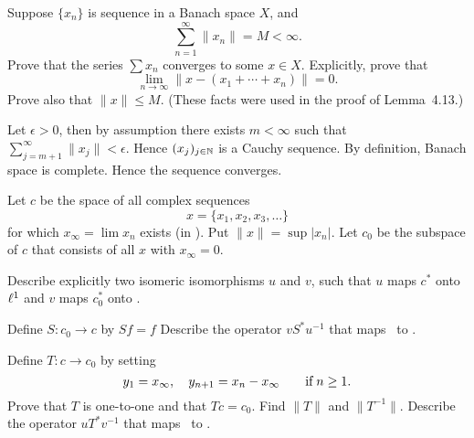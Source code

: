 \begin{enumerate}
\unfinished

\begin{excopy}
Suppose \(\{x_n\}\) is sequence in a Banach space $X$, and
\begin{equation*}
 \sum_{n=1}^\infty \|x_n\| = M < \infty.
\end{equation*}
Prove that the series \(\sum x_n\) converges to some \(x \in X\).
 Explicitly, prove that
\begin{equation*}
\lim_{n\to\infty} \|x - (x_1 + \cdots + x_n)\| = 0.
\end{equation*}
Prove also that \(\|x\| \leq M\).
 (These facts were used in the proof of Lemma~4.13.)
\end{excopy}

Let \(\epsilon>0\), then by assumption there exists \(m < \infty\)
such that \(\sum_{j=m+1}^\infty \|x_j\| < \epsilon\).
Hence \((x_j)_{j\in\mathbb{N}}\) is a Cauchy sequence. By definition,
Banach space is complete. Hence the sequence converges.


\begin{excopy}
Let $c$ be the space of all complex sequences
\begin{equation*}
x = \{x_1,x_2,x_3,\ldots\}
\end{equation*}
for which \(x_\infty = \lim x_n\) exists (in \C).
 Put \(\|x\| = \sup |x_n|\). Let \(c_0\) be the subspace of $c$ that
consists of all $x$ with \(x_\infty = 0\).
\begin{itemize}

Describe explicitly two isomeric isomorphisms $u$ and $v$,
 such that $u$ maps \(c^*\) onto \(\ell^1\)
and $v$ maps \(c_0^*\) onto \ellone.

Define \(S: c_0 \to c\) by \(Sf = f\) Describe the operator
\(vS^*u^{-1}\) that maps \ellone\ to \ellone.

Define \(T: c \to c_0\) by setting
\begin{equation*}
 y_1 = x_\infty,\quad y_{n+1} = x_n - x_\infty \qquad \textnormal{if}\; n \geq 1.
\end{equation*}
Prove that $T$ is one-to-one and that \(Tc = c_0\).
 Find \(\|T\|\) and \(\|T^{-1}\|\). Describe the
operator \(uT^*v^{-1}\) that maps \ellone\ to \ellone.
\end{itemize}
\end{excopy}

\begin{itemize}


\end{itemize}
\end{enumerate}
